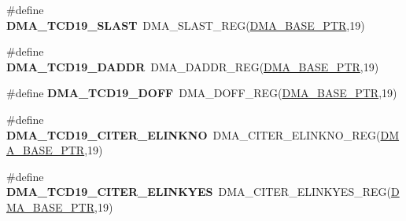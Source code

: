 \begin{DoxyCompactItemize}
\item 
\hypertarget{group___d_m_a___register___accessor___macros_gae61aae5123a8bdb369e7887ea7d9b19b}{}\#define {\bfseries D\+M\+A\+\_\+\+T\+C\+D19\+\_\+\+S\+L\+A\+S\+T}~D\+M\+A\+\_\+\+S\+L\+A\+S\+T\+\_\+\+R\+E\+G(\hyperlink{group___d_m_a___peripheral_ga6997fbc1b1973e9f27170217a3bd6f22}{D\+M\+A\+\_\+\+B\+A\+S\+E\+\_\+\+P\+T\+R},19)\label{group___d_m_a___register___accessor___macros_gae61aae5123a8bdb369e7887ea7d9b19b}

\item 
\hypertarget{group___d_m_a___register___accessor___macros_gab5894a5c7c01f083459e1634b018774f}{}\#define {\bfseries D\+M\+A\+\_\+\+T\+C\+D19\+\_\+\+D\+A\+D\+D\+R}~D\+M\+A\+\_\+\+D\+A\+D\+D\+R\+\_\+\+R\+E\+G(\hyperlink{group___d_m_a___peripheral_ga6997fbc1b1973e9f27170217a3bd6f22}{D\+M\+A\+\_\+\+B\+A\+S\+E\+\_\+\+P\+T\+R},19)\label{group___d_m_a___register___accessor___macros_gab5894a5c7c01f083459e1634b018774f}

\item 
\hypertarget{group___d_m_a___register___accessor___macros_ga32063e5042dab9e143ab582b212df70a}{}\#define {\bfseries D\+M\+A\+\_\+\+T\+C\+D19\+\_\+\+D\+O\+F\+F}~D\+M\+A\+\_\+\+D\+O\+F\+F\+\_\+\+R\+E\+G(\hyperlink{group___d_m_a___peripheral_ga6997fbc1b1973e9f27170217a3bd6f22}{D\+M\+A\+\_\+\+B\+A\+S\+E\+\_\+\+P\+T\+R},19)\label{group___d_m_a___register___accessor___macros_ga32063e5042dab9e143ab582b212df70a}

\item 
\hypertarget{group___d_m_a___register___accessor___macros_gaafc593775d0c7edb09de5b3781f455a6}{}\#define {\bfseries D\+M\+A\+\_\+\+T\+C\+D19\+\_\+\+C\+I\+T\+E\+R\+\_\+\+E\+L\+I\+N\+K\+N\+O}~D\+M\+A\+\_\+\+C\+I\+T\+E\+R\+\_\+\+E\+L\+I\+N\+K\+N\+O\+\_\+\+R\+E\+G(\hyperlink{group___d_m_a___peripheral_ga6997fbc1b1973e9f27170217a3bd6f22}{D\+M\+A\+\_\+\+B\+A\+S\+E\+\_\+\+P\+T\+R},19)\label{group___d_m_a___register___accessor___macros_gaafc593775d0c7edb09de5b3781f455a6}

\item 
\hypertarget{group___d_m_a___register___accessor___macros_ga2e3725068b0c1319253aa31fc4230a73}{}\#define {\bfseries D\+M\+A\+\_\+\+T\+C\+D19\+\_\+\+C\+I\+T\+E\+R\+\_\+\+E\+L\+I\+N\+K\+Y\+E\+S}~D\+M\+A\+\_\+\+C\+I\+T\+E\+R\+\_\+\+E\+L\+I\+N\+K\+Y\+E\+S\+\_\+\+R\+E\+G(\hyperlink{group___d_m_a___peripheral_ga6997fbc1b1973e9f27170217a3bd6f22}{D\+M\+A\+\_\+\+B\+A\+S\+E\+\_\+\+P\+T\+R},19)\label{group___d_m_a___register___accessor___macros_ga2e3725068b0c1319253aa31fc4230a73}


\end{DoxyCompactItemize}
